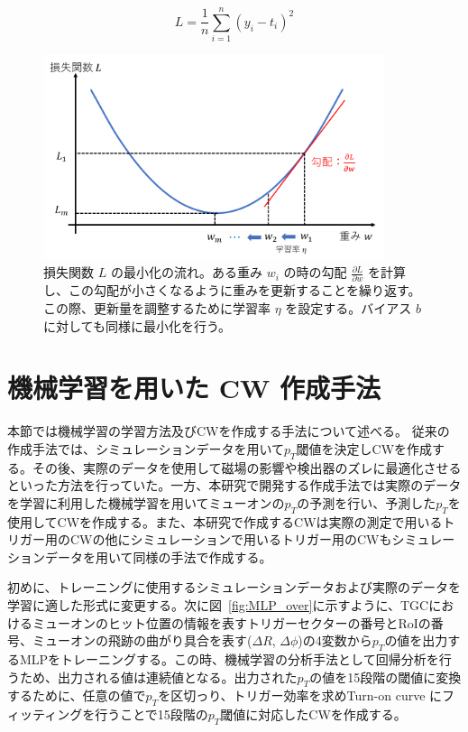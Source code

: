\begin{equation}
    L = \frac{1}{n}\sum^{n}_{i=1}(y_i-t_i)^2
    \label{equ:MSE}
\end{equation}

\begin{figure}[tb]
  \centering
  \includegraphics[clip, width=10cm]{fig/4/lossfunc_laerning.png}
  \caption{損失関数 $L$ の最小化の流れ。ある重み $w_i$ の時の勾配 $\frac{\partial L}{\partial w}$ を計算し、この勾配が小さくなるように重みを更新することを繰り返す。この際、更新量を調整するために学習率 $\eta$ を設定する。バイアス $b$ に対しても同様に最小化を行う。}
  \label{fig:lossfunction}
\end{figure}


\section{機械学習を用いた CW 作成手法}
本節では機械学習の学習方法及びCWを作成する手法について述べる。
従来の作成手法では、シミュレーションデータを用いて$p_T$閾値を決定しCWを作成する。その後、実際のデータを使用して磁場の影響や検出器のズレに最適化させるといった方法を行っていた。一方、本研究で開発する作成手法では実際のデータを学習に利用した機械学習を用いてミューオンの$p_T$の予測を行い、予測した$p_T$を使用してCWを作成する。また、本研究で作成するCWは実際の測定で用いるトリガー用のCWの他にシミュレーションで用いるトリガー用のCWもシミュレーションデータを用いて同様の手法で作成する。

初めに、トレーニングに使用するシミュレーションデータおよび実際のデータを学習に適した形式に変更する。次に図~\ref{fig:MLP_over}に示すように、TGCにおけるミューオンのヒット位置の情報を表すトリガーセクターの番号とRoIの番号、ミューオンの飛跡の曲がり具合を表す($\Delta R$, $\Delta \phi$)の4変数から$p_T$の値を出力するMLPをトレーニングする。この時、機械学習の分析手法として回帰分析を行うため、出力される値は連続値となる。出力された$p_T$の値を15段階の閾値に変換するために、任意の値で$p_T$を区切っり、トリガー効率を求めTurn-on curve にフィッティングを行うことで15段階の$p_T$閾値に対応したCWを作成する。

